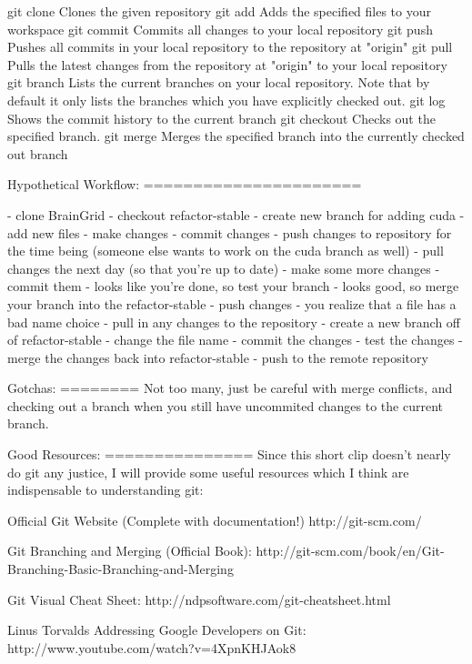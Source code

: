 	git clone		Clones the given repository
	git add			Adds the specified files to your workspace
	git commit		Commits all changes to your local repository
	git push		Pushes all commits in your local repository to the repository at "origin"
	git pull		Pulls the latest changes from the repository at "origin" to your local repository
	git branch		Lists the current branches on your local repository.  Note that by default it only lists the branches which you have explicitly checked out.
	git log			Shows the commit history to the current branch
	git checkout	Checks out the specified branch.
	git merge		Merges the specified branch into the currently checked out branch




Hypothetical Workflow:
======================

	- clone BrainGrid
	- checkout refactor-stable
	- create new branch for adding cuda
	- add new files
	- make changes
	- commit changes
	- push changes to repository for the time being (someone else wants to work on the cuda branch as well)
	- pull changes the next day (so that you're up to date)
	- make some more changes
	- commit them
	- looks like you're done, so test your branch
	- looks good, so merge your branch into the refactor-stable
	- push changes
	- you realize that a file has a bad name choice
	- pull in any changes to the repository
	- create a new branch off of refactor-stable
	- change the file name
	- commit the changes
	- test the changes
	- merge the changes back into refactor-stable
	- push to the remote repository



Gotchas:
========
Not too many, just be careful with merge conflicts, and checking out a branch when you still have uncommited changes to the current branch.



Good Resources:
===============
Since this short clip doesn't nearly do git any justice, I will provide some useful resources which I think are indispensable to understanding git:

	Official Git Website (Complete with documentation!)
	http://git-scm.com/

	Git Branching and Merging (Official Book):
	http://git-scm.com/book/en/Git-Branching-Basic-Branching-and-Merging
	
	Git Visual Cheat Sheet:
	http://ndpsoftware.com/git-cheatsheet.html
	
	Linus Torvalds Addressing Google Developers on Git:
	http://www.youtube.com/watch?v=4XpnKHJAok8
	
	

